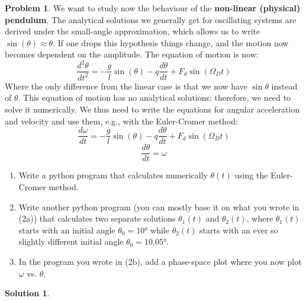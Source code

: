 \documentclass[10pt]{article}
\theoremstyle{definition}
\newtheorem{problem}{Problem}
\newtheorem{soln}{Solution}
\begin{document}
\begin{problem}
      We want to study now the behaviour of the \textbf{non-linear (physical) pendulum}. The analytical solutions we
generally get for oscillating systems are derived under the small-angle approximation, which allows us to write
$\sin(\theta)\approx\theta$. If one drops this hypothesis things change, and the motion now becomes dependent on the amplitude.
The equation of motion is now:
$$\frac{d^2\theta}{dt^2}=-\frac{g}{l}\sin\left(\theta\right)-q\frac{d\theta}{dt}+F_d\sin\left(\Omega_Dt\right)$$
Where the only difference from the linear case is that we now have $\sin\theta$ instead of $\theta$. This equation of motion 
has no analytical solutions; therefore, we need to solve it numerically. We thus need to write the equations 
for angular acceleration and velocity and use them, e.g., with the Euler-Cromer method:
$$\frac{d\omega}{dt}=-\frac{g}{l}\sin\left(\theta\right)-q\frac{d\theta}{dt}+F_d\sin\left(\Omega_Dt\right)$$
$$\frac{d\theta}{dt}=\omega$$
\begin{enumerate}[label=(\alph*)]
      \item Write a python program that calculates numerically $\theta(t)$ using the Euler-Cromer method.
      \item Write another python program (you can mostly base it on what you wrote in (2a)) that calculates two separate
      solutions $\theta_1(t)$ and $\theta_2(t)$, where $\theta_1(t)$ starts with an initial angle $\theta_0=10\unit{\degree}$ while $\theta_2(t)$ starts with an ever so
      slightly different initial angle $\theta_0=10.05\unit{\degree}$.
      \item In the program you wrote in (2b), add a phase-space plot where you now plot $\omega$ vs. $\theta$.
\end{enumerate}
\end{problem}
\begin{soln}
\end{soln}
\end{document}

